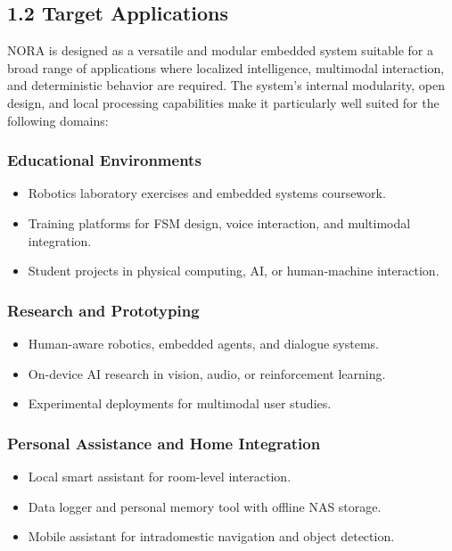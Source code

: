 \subsection*{1.2 Target Applications}

NORA is designed as a versatile and modular embedded system suitable for a broad range of applications where localized intelligence, multimodal interaction, and deterministic behavior are required. The system’s internal modularity, open design, and local processing capabilities make it particularly well suited for the following domains:

\subsubsection*{Educational Environments}
\begin{itemize}
    \item Robotics laboratory exercises and embedded systems coursework.
    \item Training platforms for FSM design, voice interaction, and multimodal integration.
    \item Student projects in physical computing, AI, or human-machine interaction.
\end{itemize}

\subsubsection*{Research and Prototyping}
\begin{itemize}
    \item Human-aware robotics, embedded agents, and dialogue systems.
    \item On-device AI research in vision, audio, or reinforcement learning.
    \item Experimental deployments for multimodal user studies.
\end{itemize}

\subsubsection*{Personal Assistance and Home Integration}
\begin{itemize}
    \item Local smart assistant for room-level interaction.
    \item Data logger and personal memory tool with offline NAS storage.
    \item Mobile assistant for intradomestic navigation and object detection.
\end{itemize}

